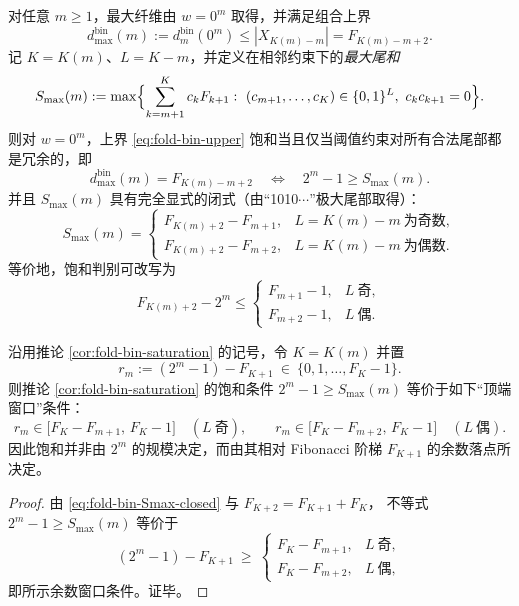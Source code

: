 \begin{corollary}\label{cor:fold-bin-saturation}
对任意 \(m\ge 1\)，最大纤维由 \(w=0^m\) 取得，并满足组合上界
\begin{equation}\label{eq:fold-bin-upper}
d^{\mathrm{bin}}_{\max}(m):=d^{\mathrm{bin}}_m(0^m)\le |X_{K(m)-m}|=F_{K(m)-m+2}.
\end{equation}
记 \(K=K(m)\)、\(L=K-m\)，并定义在相邻约束下的\emph{最大尾和}
\[
S_{\max}(m):=\max\Bigl\{\sum_{k=m+1}^{K} c_k F_{k+1}:\ (c_{m+1},\dots,c_K)\in\{0,1\}^{L},\ c_k c_{k+1}=0\Bigr\}.
\]
则对 \(w=0^m\)，上界 \eqref{eq:fold-bin-upper} 饱和当且仅当阈值约束对所有合法尾部都是冗余的，即
\begin{equation}\label{eq:fold-bin-sat-iff}
d^{\mathrm{bin}}_{\max}(m)=F_{K(m)-m+2}\quad\Longleftrightarrow\quad 2^m-1\ge S_{\max}(m).
\end{equation}
并且 \(S_{\max}(m)\) 具有完全显式的闭式（由“1010\(\cdots\)”极大尾部取得）：
\begin{equation}\label{eq:fold-bin-Smax-closed}
S_{\max}(m)=
\begin{cases}
F_{K(m)+2}-F_{m+1}, & L=K(m)-m\ \text{为奇数},\\
F_{K(m)+2}-F_{m+2}, & L=K(m)-m\ \text{为偶数}.
\end{cases}
\end{equation}
等价地，饱和判别可改写为
\[
F_{K(m)+2}-2^m\le
\begin{cases}
F_{m+1}-1,& L\ \text{奇},\\
F_{m+2}-1,& L\ \text{偶}.
\end{cases}
\]
\end{corollary}

\begin{corollary}\label{cor:fold-bin-saturation-residue-window}
沿用推论 \ref{cor:fold-bin-saturation} 的记号，令 \(K=K(m)\) 并置
\[
r_m:=(2^m-1)-F_{K+1}\ \in\ \{0,1,\dots,F_K-1\}.
\]
则推论 \ref{cor:fold-bin-saturation} 的饱和条件
\(
2^m-1\ge S_{\max}(m)
\)
等价于如下“顶端窗口”条件：
\[
r_m\in\bigl[F_K-F_{m+1},\,F_K-1\bigr]\quad (L\ \text{奇}),
\qquad
r_m\in\bigl[F_K-F_{m+2},\,F_K-1\bigr]\quad (L\ \text{偶}).
\]
因此饱和并非由 \(2^m\) 的规模决定，而由其相对 Fibonacci 阶梯 \(F_{K+1}\) 的余数落点所决定。
\end{corollary}
\begin{proof}
由 \eqref{eq:fold-bin-Smax-closed} 与 \(F_{K+2}=F_{K+1}+F_K\)，
不等式 \(2^m-1\ge S_{\max}(m)\) 等价于
\[
(2^m-1)-F_{K+1}\ \ge\
\begin{cases}
F_K-F_{m+1},& L\ \text{奇},\\
F_K-F_{m+2},& L\ \text{偶},
\end{cases}
\]
即所示余数窗口条件。证毕。
\end{proof}

